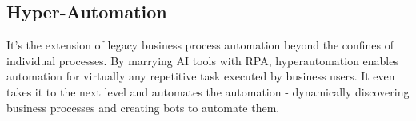 \documentclass[10pt,a4paper]{article}
\begin{document}
\subsection{Hyper-Automation}
\justifying
It’s the extension of legacy business process automation beyond the confines of individual processes. By marrying AI tools with RPA, hyperautomation enables automation for virtually any repetitive task executed by business users.
It even takes it to the next level and automates the automation - dynamically discovering business processes and creating bots to automate them.
\end{document}

